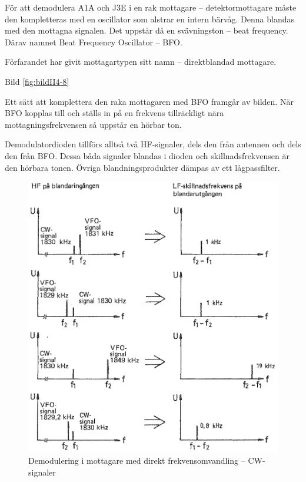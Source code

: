 För att demodulera A1A och J3E i en rak mottagare -- detektormottagare måste
den kompletteras med en oscillator som alstrar en intern bärvåg.
Denna blandas med den mottagna signalen.
Det uppstår då en svävningston -- beat frequency.
Därav namnet Beat Frequency Oscillator -- BFO.

Förfarandet har givit mottagartypen sitt namn -- direktblandad mottagare.

Bild \ref{fig:bildII4-8}

Ett sätt att komplettera den raka mottagaren med BFO framgår av bilden.
När BFO kopplas till och ställs in på en frekvens tillräckligt
nära mottagningsfrekvensen så uppstår en hörbar ton.

Demodulatordioden tillförs alltså två HF-signaler, dels den från
antennen och dels den från BFO.
Dessa båda signaler blandas i dioden och skillnadsfrekvensen är den hörbara
tonen.
Övriga blandningsprodukter dämpas av ett lågpassfilter.

\begin{figure}
  \includegraphics[width=\textwidth]{images/cropped_pdfs/bild_2_4-09.pdf}
  \caption{Demodulering i mottagare med direkt frekvensomvandling -- CW-signaler}
  \label{fig:bildII4-9}
\end{figure}

